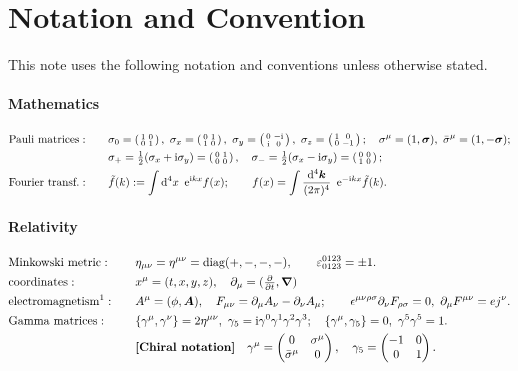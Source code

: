\documentclass[CheatSheet]{subfiles}
\begin{document}
\summarystyle
\setcounter{section}{-1}
\section{Notation and Convention}
This note uses the following notation and conventions unless otherwise stated.

\paragraph{Mathematics}
\begin{alignat}{2}
&\text{Pauli matrices}:&\quad&
 \sigma_0 = \spmat{1&0\\0&1},~
\sigma_x = \spmat{0&1\\1&0},~
\sigma_y = \spmat{0&-\ii\\\ii&0},~
\sigma_z = \spmat{1&0\\0&-1};\quad
\sigma^\mu=(1,\vc\sigma),~
\bar\sigma^\mu=(1,-\vc\sigma);
\notag\\
&&&
\sigma_+ = \tfrac12(\sigma_x+\ii\sigma_y) = \spmat{0&1\\0&0},\quad
\sigma_- = \tfrac12(\sigma_x-\ii\sigma_y) = \spmat{0&0\\1&0};
\\
&\text{Fourier transf.}:&&
 \tilde f(k) := \int\dd^4x\ \ee^{\ii kx}f(x); \qquad
        f(x) = \int\ddP[4]{k}\ \ee^{-\ii kx}\tilde f(k).
\end{alignat}


\paragraph{Relativity}
\begin{alignat}{2}
&\text{Minkowski metric}:&\quad&
\eta_{\mu\nu} = \eta^{\mu\nu}=\diag(+,-,-,-),
\qquad
\vep^{0123}_{0123}=\pm1.
\\
&\text{coordinates}:&&
x^\mu=(t,x,y,z),\quad
\partial_\mu=(\tfrac{\partial}{\partial t},\vc\nabla)
\\
&\text{electromagnetism\footnotemark}:&&
A^\mu=(\phi,\vc A),\quad
F_{\mu\nu}=\partial_\mu A_\nu-\partial_\nu A_\mu;\qquad
\epsilon^{\mu\nu\rho\sigma}\partial_\nu F_{\rho\sigma}=0,~
\partial_\mu  F^{\mu\nu}=e j^\nu.
\\
&\text{Gamma matrices}:&&
\{\gamma^\mu,\gamma^\nu\}=2\eta^{\mu\nu},~
\gamma_5=\ii\gamma^0\gamma^1\gamma^2\gamma^3;\quad
\{\gamma^\mu,\gamma_5\}=0,~
\gamma^5\gamma^5=1.
\\&&&\text{\textbf{[Chiral notation]}}\quad
 \gamma^\mu=\pmat{0&\sigma^\mu\\\bar\sigma^\mu&0},\quad \gamma_5=\pmat{-1&0\\0&1}.
\end{alignat}
\end{document}
